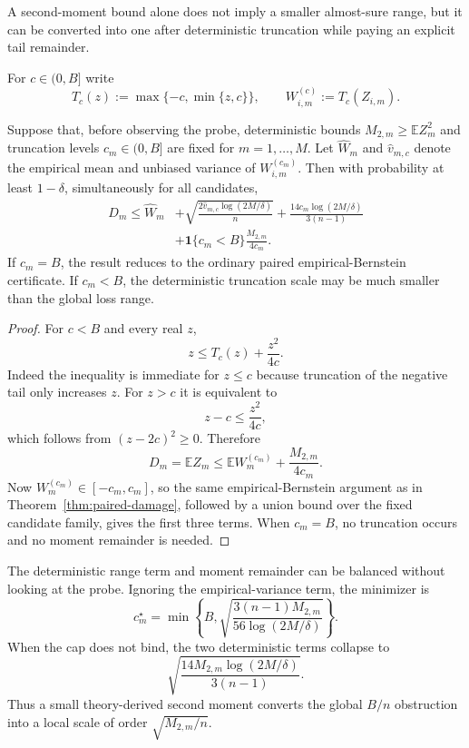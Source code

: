 A second-moment bound alone does not imply a smaller almost-sure range, but it can be converted into one after deterministic truncation while paying an explicit tail remainder.

For $c\in(0,B]$ write
\[
T_c(z):=\max\{-c,\min\{z,c\}\},
\qquad
W_{i,m}^{(c)}:=T_c(Z_{i,m}).
\]

\begin{theorem}\label{thm:localized-damage}
Suppose that, before observing the probe, deterministic bounds $M_{2,m}\ge\mathbb E Z_m^2$ and truncation levels $c_m\in(0,B]$ are fixed for $m=1,\ldots,M$. Let $\widehat W_m$ and $\widehat v_{m,c}$ denote the empirical mean and unbiased variance of $W_{i,m}^{(c_m)}$. Then with probability at least $1-\delta$, simultaneously for all candidates,
\[
\boxed{
\begin{aligned}
D_m\le
\widehat W_m
&+\sqrt{\frac{2\widehat v_{m,c}\log(2M/\delta)}{n}}
+\frac{14c_m\log(2M/\delta)}{3(n-1)}\\
&+\mathbf 1\{c_m<B\}\frac{M_{2,m}}{4c_m}.
\end{aligned}}
\]
If $c_m=B$, the result reduces to the ordinary paired empirical-Bernstein certificate. If $c_m<B$, the deterministic truncation scale may be much smaller than the global loss range.
\end{theorem}

\begin{proof}
For $c<B$ and every real $z$,
\[
z\le T_c(z)+\frac{z^2}{4c}.
\]
Indeed the inequality is immediate for $z\le c$ because truncation of the negative tail only increases $z$. For $z>c$ it is equivalent to
\[
z-c\le\frac{z^2}{4c},
\]
which follows from $(z-2c)^2\ge0$. Therefore
\[
D_m=\mathbb E Z_m
\le
\mathbb E W_m^{(c_m)}+\frac{M_{2,m}}{4c_m}.
\]
Now $W_m^{(c_m)}\in[-c_m,c_m]$, so the same empirical-Bernstein argument as in Theorem~\ref{thm:paired-damage}, followed by a union bound over the fixed candidate family, gives the first three terms. When $c_m=B$, no truncation occurs and no moment remainder is needed.
\end{proof}

The deterministic range term and moment remainder can be balanced without looking at the probe. Ignoring the empirical-variance term, the minimizer is
\[
\boxed{
c_m^\star
=
\min\left\{
B,
\sqrt{\frac{3(n-1)M_{2,m}}{56\log(2M/\delta)}}
\right\}.}
\]
When the cap does not bind, the two deterministic terms collapse to
\[
\sqrt{\frac{14M_{2,m}\log(2M/\delta)}{3(n-1)}}.
\]
Thus a small theory-derived second moment converts the global $B/n$ obstruction into a local scale of order $\sqrt{M_{2,m}/n}$.

